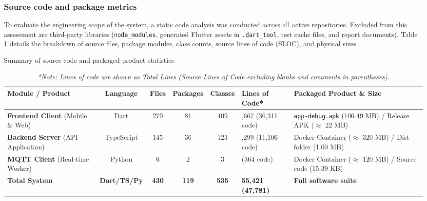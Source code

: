 \documentclass[../Main.tex]{subfiles}
\begin{document}
\subsubsection{Source code and package metrics}

To evaluate the engineering scope of the system, a static code analysis was conducted across all active repositories. Excluded from this assessment are third-party libraries (\texttt{node\_modules}, generated Flutter assets in \texttt{.dart\_tool}, test cache files, and report documents). Table \ref{table:code_statistics} details the breakdown of source files, package modules, class counts, source lines of code (SLOC), and physical sizes.

\begin{table}[H]
    \centering
    \caption{Summary of source code and packaged product statistics}
    \label{table:code_statistics}
    \renewcommand{\arraystretch}{1.3} %

    \begin{tabular}{|>{\raggedright\arraybackslash}p{2cm}|c|c|c|c|>{\centering\arraybackslash}p{1.5cm}|>{\raggedright\arraybackslash}p{3cm}|}
        \hline
        \textbf{Module / Product}                 & \textbf{Language}   & \textbf{Files} & \textbf{Packages} & \textbf{Classes} & \textbf{Lines of Code*}  & \textbf{Packaged Product \& Size}                                  \\
        \hline
        \textbf{Frontend Client} (Mobile \& Web)  & Dart                & 279            & 81                & 409              & 41,667 (36,311 code)     & \texttt{app-debug.apk} (106.49 MB) / Release APK ($\approx$ 22 MB) \\
        \hline
        \textbf{Backend Server} (API Application) & TypeScript          & 145            & 36                & 123              & 13,299 (11,106 code)     & Docker Container ($\approx$ 320 MB) / Dist folder (1.60 MB)        \\
        \hline
        \textbf{MQTT Client} (Real-time Worker)   & Python              & 6              & 2                 & 3                & 455 (364 code)           & Docker Container ($\approx$ 120 MB) / Source code (15.39 KB)       \\
        \hline
        \textbf{Total System}                     & \textbf{Dart/TS/Py} & \textbf{430}   & \textbf{119}      & \textbf{535}     & \textbf{55,421 (47,781)} & \textbf{Full software suite}                                       \\
        \hline
    \end{tabular}
    \vspace{0.1cm}
    \caption*{\textit{*Note: Lines of code are shown as Total Lines (Source Lines of Code excluding blanks and comments in parentheses).}}
\end{table}
\end{document}
